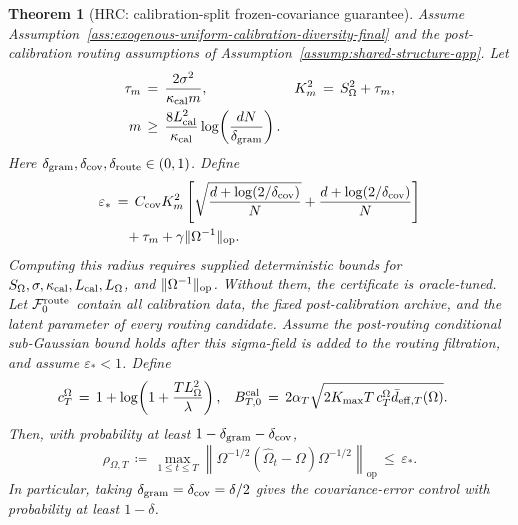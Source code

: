 \documentclass{article} %
\newtheorem{theorem}{Theorem}
\begin{document}
\begin{theorem}[HRC: calibration-split frozen-covariance guarantee]
Assume Assumption~\ref{ass:exogenous-uniform-calibration-diversity-final} and
the post-calibration routing assumptions of
Assumption~\ref{assump:shared-structure-app}.  Let
\begin{equation}
\begin{aligned}
\tau_m
&\,=\,
\frac{2\sigma^2}{\kappa_{\rm cal}m},
&
K_m^2
&\,=\,
S_\Omega^2+\tau_m,
\\
m
&\,\geq\,
\frac{8L_{\rm cal}^2}{\kappa_{\rm cal}}
\log\!\left(\frac{dN}{\delta_{\rm gram}}\right).
\end{aligned}
\end{equation}
Here
\(\delta_{\rm gram},\delta_{\rm cov},\delta_{\rm route}\in(0,1)\). Define
\begin{equation}
\begin{aligned}
\varepsilon_*
&\,=\,
C_{\rm cov}K_m^2\left[
\sqrt{\frac{d+\log(2/\delta_{\rm cov})}{N}}
+
\frac{d+\log(2/\delta_{\rm cov})}{N}
\right]
\\
&\quad
+
\tau_m
+
\gamma\|\Omega^{-1}\|_{\mathrm{op}}.
\end{aligned}
\end{equation}
Computing this radius requires supplied deterministic bounds for
\(S_\Omega,\sigma,\kappa_{\rm cal},L_{\rm cal},L_\Omega\), and
\(\|\Omega^{-1}\|_{\rm op}\). Without them, the certificate is oracle-tuned.
Let \(\mathcal F_0^{\rm route}\) contain all calibration data, the fixed
post-calibration archive, and the latent parameter of every routing candidate.
Assume the post-routing conditional sub-Gaussian
bound holds after this sigma-field is added to the routing filtration, and
assume \(\varepsilon_*<1\). Define
\begin{equation}
\begin{aligned}
c_T^\Omega
&\,=\,
1+\log\!\left(1+\frac{TL_\Omega^2}{\lambda}\right),
&
B_{T,0}^{\rm cal}
&\,=\,
2\alpha_T
\sqrt{
2K_{\max}T\,c_T^\Omega
\bar d_{\mathrm{eff},T}(\Omega)
}.
\end{aligned}
\end{equation}
Then, with probability at least
\(1-\delta_{\rm gram}-\delta_{\rm cov}\),
\begin{equation}
\rho_{\Omega,T}
\,\coloneqq\,
\max_{1\le t\le T}
\left\|
\Omega^{-1/2}(\widehat\Omega_t-\Omega)\Omega^{-1/2}
\right\|_{\mathrm{op}}
\,\leq\,
\varepsilon_*.
\end{equation}
In particular, taking \(\delta_{\rm gram}=\delta_{\rm cov}=\delta/2\) gives the
covariance-error control with probability at least \(1-\delta\).


\end{theorem}
\end{document}
